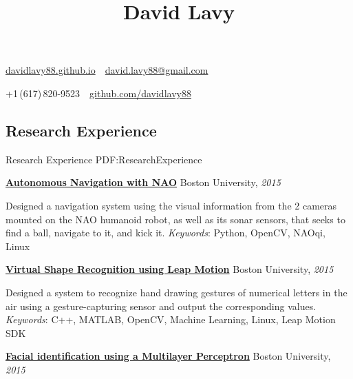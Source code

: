 \documentclass[letterpaper,MMMyyyy,nonstop]{simpleresumecv}
\newcommand{\CVAuthor}{David Lavy}
\newcommand{\CVWebpage}{davidlavy88.github.io}
\newcommand*{\TitleFont}{%
      \usefont{\encodingdefault}{\rmdefault}{bx}{n}%
      \fontsize{20}{24}%
      \selectfont}
\begin{document}

\title{\TitleFont \CVAuthor}

\begin{subtitle}
\href{\CVWebpage}
{\CVWebpage}
\,\SubBulletSymbol\,
\href{mailto:david.lavy88@gmail.com}
{david.lavy88@gmail.com}
\par
+1\,(617)\,820-9523
\,\SubBulletSymbol\,
\href{https://github.com/davidlavy88}
{github.com/davidlavy88}

\end{subtitle}

\begin{body}


\section
{Research Experience}
{Research Experience}
{PDF:ResearchExperience}

\href{http://www.bu.edu/vip/files/pubs/reports/DLTM15-06buece.pdf}
{\textbf{Autonomous Navigation with NAO}}
\hfill
Boston University, \textit{2015}

\GapNoBreak
\BulletItem
Designed a navigation system using the visual information from the 2 cameras mounted on the NAO humanoid robot, as well as its sonar sensors, that seeks to find a ball, navigate to it, and kick it.
\GapNoBreak
\textit{Keywords}: Python, OpenCV, NAOqi, Linux

\BigGap
\href{http://www.bu.edu/vip/files/pubs/reports/DLDP15-03buece.pdf}
{\textbf{Virtual Shape Recognition using Leap Motion}}
\hfill
Boston University, \textit{2015}

\GapNoBreak
\BulletItem
Designed a system to recognize hand drawing gestures of numerical letters in the air using a gesture-capturing sensor and  output the corresponding values.
\GapNoBreak
\textit{Keywords}: C++, MATLAB, OpenCV, Machine Learning, Linux, Leap Motion SDK

\BigGap
\href{https://docs.google.com/presentation/d/1328Qvm9VlAZadwlNoU3n5m1REY36m_hGcakSYlxW2vM/edit?ts=565d2938#slide=id.p}
{\textbf{Facial identification using a Multilayer Perceptron}}
\hfill
Boston University, \textit{2015}


\end{body}
\end{document}

